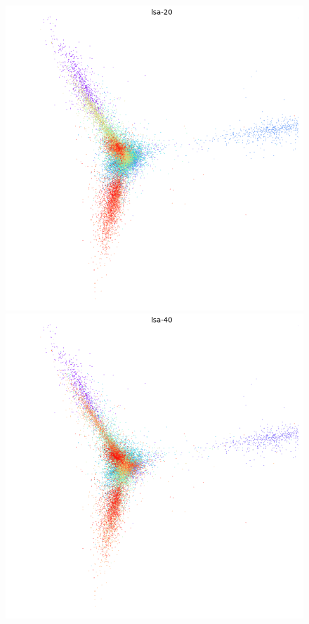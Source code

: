\documentclass[12pt]{article}
\begin{document}
\begin{figure}
  \centering
  \newcommand{\ww}{0.48}
  \includegraphics[width=\ww\linewidth]{lsa-20.png}
  \includegraphics[width=\ww\linewidth]{lsa-40.png}

\end{figure}
\end{document}
